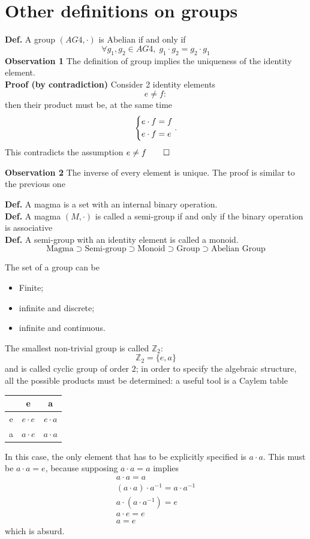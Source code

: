 \section{Other definitions on groups}
\textbf{Def.} A group $(AG4,\cdot)$ is Abelian if and only if
$$\forall g_1,g_2\in AG4,\;g_1\cdot g_2 = g_2\cdot g_1$$
\textbf{Observation 1} The definition of group implies the uniqueness of the
identity element.\\
\textbf{Proof (by contradiction)} Consider 2 identity elements
$$e\neq f:$$
then their product must be, at the same time
$$\begin{dcases*}
  e\cdot f = f\\
  e\cdot f = e
  \end{dcases*}.$$
This contradicts the assumption $e\neq f \qed$ %

\textbf{Observation 2} The inverse of every element is unique. The proof is similar
to the previous one

\textbf{Def.} A magma is a set with an internal binary operation.\\
\textbf{Def.} A magma $(M,\cdot)$ is called a semi-group if and only if the binary 
operation is associative\\
\textbf{Def.} A semi-group with an identity element is called a monoid.\\
$$\text{Magma}\supset\text{Semi-group}\supset\text{Monoid}\supset\text{Group}\supset
\text{Abelian Group}$$

The set of a group can be
\begin{itemize}
    \item Finite;
    \item infinite and discrete;
    \item infinite and continuous.
\end{itemize}
The smallest non-trivial group is called $\mathbb{Z}_2$:
$$\mathbb{Z}_2 = \{e,a\}$$
and is called cyclic group of order $2$; in order to specify the algebraic structure,
all the possible products must be determined: a useful tool is a Caylem table
\begin{table}[ht!]
    \centering
    \begin{tabular}{c|cc}
		&e	&a\\ \hline
e	&$e \cdot e$&$e\cdot a$\\
	a	&$a\cdot e$&$a\cdot a$\\
    \end{tabular} 
\end{table}
In this case, the only element that has to be explicitly specified is $a\cdot a$.
This must be $a\cdot a=e$, because supposing $a\cdot a =a$ implies
\begin{gather*}
a\cdot a = a\\
(a\cdot a) \cdot a^{-1} = a\cdot a^{-1}\\
a\cdot (a\cdot a^{-1}) = e\\
a\cdot e = e\\
a = e
\end{gather*}
which is absurd.

